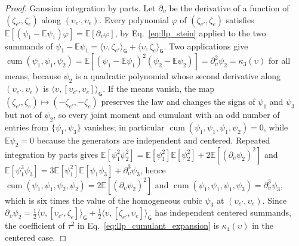 \begin{proof}
Gaussian integration by parts. Let $\partial_\upsilon$ be the derivative of a function of $(\zeta_{e'},\zeta_e)$ along $(\upsilon_{e'},\upsilon_e)$. Every polynomial $\varphi$ of $(\zeta_{e'},\zeta_e)$ satisfies $\mathbb E[(\psi_1-\mathbb E\psi_1)\varphi]=\mathbb E[\partial_\upsilon\varphi]$, by Eq.~\eqref{eq:llp_stein} applied to the two summands of $\psi_1-\mathbb E\psi_1=\langle\upsilon,\zeta_{e'}\rangle_{\mathsf G}+\langle\upsilon,\zeta_e\rangle_{\mathsf G}$. Two applications give $\operatorname{cum}(\psi_1,\psi_1,\psi_2)=\mathbb E[(\psi_1-\mathbb E\psi_1)^2(\psi_2-\mathbb E\psi_2)]=\partial_\upsilon^2\psi_2=\kappa_3(\upsilon)$ for all means, because $\psi_2$ is a quadratic polynomial whose second derivative along $(\upsilon_{e'},\upsilon_e)$ is $\langle\upsilon,[\upsilon_{e'},\upsilon_e]\rangle_{\mathsf G}$. If the means vanish, the map $(\zeta_{e'},\zeta_e)\mapsto(-\zeta_{e'},-\zeta_e)$ preserves the law and changes the signs of $\psi_1$ and $\psi_3$ but not of $\psi_2$, so every joint moment and cumulant with an odd number of entries from $\{\psi_1,\psi_3\}$ vanishes; in particular $\operatorname{cum}(\psi_1,\psi_1,\psi_1,\psi_2)=0$, while $\mathbb E\psi_2=0$ because the generators are independent and centered. Repeated integration by parts gives $\mathbb E[\psi_1^2\psi_2^2]=\mathbb E[\psi_1^2]\mathbb E[\psi_2^2]+2\mathbb E[(\partial_\upsilon\psi_2)^2]$ and $\mathbb E[\psi_1^3\psi_3]=3\mathbb E[\psi_1^2]\mathbb E[\psi_1\psi_3]+\partial_\upsilon^3\psi_3$, hence $\operatorname{cum}(\psi_1,\psi_1,\psi_2,\psi_2)=2\mathbb E[(\partial_\upsilon\psi_2)^2]$ and $\operatorname{cum}(\psi_1,\psi_1,\psi_1,\psi_3)=\partial_\upsilon^3\psi_3$, which is six times the value of the homogeneous cubic $\psi_3$ at $(\upsilon_{e'},\upsilon_e)$. Since $\partial_\upsilon\psi_2=\frac12\langle\upsilon,[\upsilon_{e'},\zeta_e]\rangle_{\mathsf G}+\frac12\langle\upsilon,[\zeta_{e'},\upsilon_e]\rangle_{\mathsf G}$ has independent centered summands, the coefficient of $\tau^2$ in Eq.~\eqref{eq:llp_cumulant_expansion} is $\kappa_4(\upsilon)$ in the centered case.


\end{proof}
